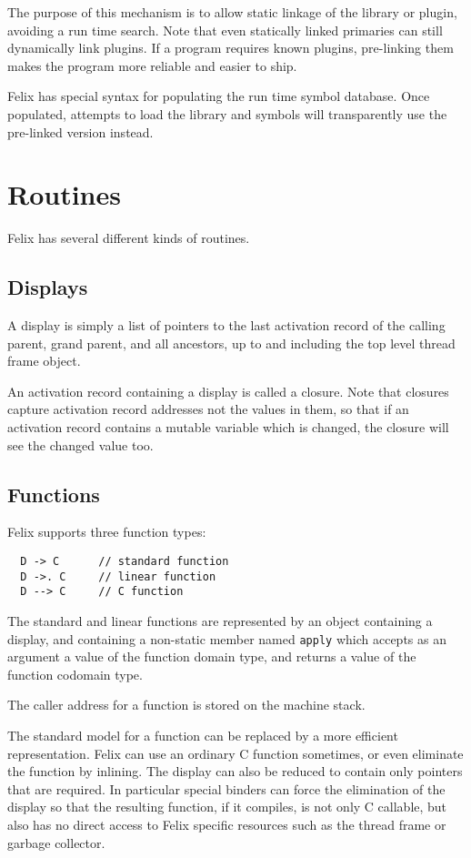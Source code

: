 \documentclass[oneside]{book}
\begin{document}
The purpose of this mechanism is to allow static linkage of
the library or plugin, avoiding a run time search.
Note that even statically linked primaries can still dynamically
link plugins. If a program requires known plugins, pre-linking
them makes the program more reliable and easier to ship.

Felix has special syntax for populating the run time symbol
database. Once populated, attempts to load the library and symbols
will transparently use the pre-linked version instead.

\chapter{Routines}
Felix has several different kinds of routines.

\section{Displays}
A display is simply a list of pointers to the last activation record of 
the calling parent, grand parent, and all ancestors, up to and including
the top level thread frame object.

An activation record containing a display is called a closure.
Note that closures capture activation record addresses not the
values in them, so that if an activation record contains a mutable
variable which is changed, the closure will see the changed value too.


\section{Functions}
Felix supports three function types:

\begin{verbatim}
  D -> C      // standard function
  D ->. C     // linear function
  D --> C     // C function
\end{verbatim}

The standard and linear functions are represented by an object containing a display,
and containing a non-static member named \verb$apply$ which accepts as an argument
a value of the function domain type, and returns a value of the function codomain type.

The caller address for a function is stored on the machine stack.

The standard model for a function can be replaced by a more efficient representation.
Felix can use an ordinary C function sometimes, or even eliminate the function
by inlining. The display can also be reduced to contain only pointers that are
required. In particular special binders can force the elimination of the display
so that the resulting function, if it compiles, is not only C callable, but also
has no direct access to Felix specific resources such as the thread frame or
garbage collector.
\end{document}
